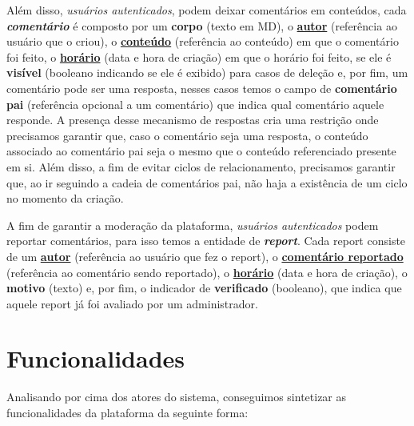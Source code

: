 Além disso, \textit{usuários autenticados}, podem deixar comentários em
conteúdos, cada \textbf{\textit{comentário}} é composto por um \textbf{corpo}
(texto em MD), o \textbf{\underline{autor}} (referência ao usuário que o
criou), o \textbf{\underline{conteúdo}} (referência ao conteúdo) em que o
comentário foi feito, o \textbf{\underline{horário}} (data e hora de criação)
em que o horário foi feito, se ele é \textbf{visível} (booleano indicando se
ele é exibido) para casos de deleção e, por fim, um comentário pode ser uma
resposta, nesses casos temos o campo de \textbf{comentário pai} (referência
opcional a um comentário) que indica qual comentário aquele responde. A
presença desse mecanismo de respostas cria uma restrição onde precisamos
garantir que, caso o comentário seja uma resposta, o conteúdo associado ao
comentário pai seja o mesmo que o conteúdo referenciado presente em si. Além
disso, a fim de evitar ciclos de relacionamento, precisamos garantir que, ao ir
seguindo a cadeia de comentários pai, não haja a existência de um ciclo no
momento da criação.


A fim de garantir a moderação da plataforma, \textit{usuários autenticados}
podem reportar comentários, para isso temos a entidade de
\textbf{\textit{report}}. Cada report consiste de um \textbf{\underline{autor}}
(referência ao usuário que fez o report), o \textbf{\underline{comentário
    reportado}} (referência ao comentário sendo reportado), o
\textbf{\underline{horário}} (data e hora de criação), o \textbf{motivo}
(texto) e, por fim, o indicador de \textbf{verificado} (booleano), que indica
que aquele report já foi avaliado por um administrador.


\section{Funcionalidades}

Analisando por cima dos atores do sistema, conseguimos sintetizar as
funcionalidades da plataforma da seguinte forma:

